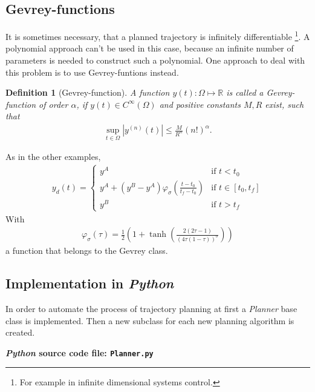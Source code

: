 \documentclass[a4paper,11pt,headings=standardclasses,parskip=half]{scrartcl}
\newtheorem{defi}{Definition}[section]
\newcommand{\R}{\mathbb{R}} %
\newcommand{\py}{\emph{Python}\xspace}
\begin{document}
\subsection{Gevrey-functions}
It is sometimes necessary, that a planned trajectory is infinitely differentiable \footnote{For example in infinite dimensional systems control.}. A polynomial approach can't be used in this case, because an infinite number of parameters is needed to construct such a polynomial. One approach to deal with this problem is to use Gevrey-funtions instead.
\begin{defi}[Gevrey-function] A function $y(t):\Omega \mapsto \R$ is called a Gevrey-function of order $\alpha$, if $y(t) \in C^\infty(\Omega)$ and positive constants $M, R$ exist, such that
\begin{align*}
\sup_{t\in\Omega}{|y^{(n)}(t)| \leq \frac{M}{R^n}(n!)^\alpha}.
\end{align*}
\end{defi}
As in the other examples, 
\begin{align}
y_d(t) = \begin{cases} y^A & \textrm{if } t<t_0 \\ 
y^A + (y^B-y^A)\varphi_\sigma\left(\frac{t-t_0}{t_f-t_0}\right) &\textrm{if } t \in [t_0, t_f] \\ 
y^B &\textrm{if } t>t_f\end{cases}
\end{align}
With
\begin{align}
\varphi_\sigma\left(\tau\right) = \frac{1}{2}\left(1 + \tanh \left( \frac{2(2\tau-1)}{(4\tau(1-\tau))^\sigma}\right)\right)
\end{align}
a function that belongs to the Gevrey class.
\subsection{Implementation in \py}
In order to automate the process of trajectory planning at first a \emph{Planner} base class is implemented. Then a new subclass for each new planning algorithm is created.

\textbf{\py source code file: \texttt{Planner.py}}
\end{document}
